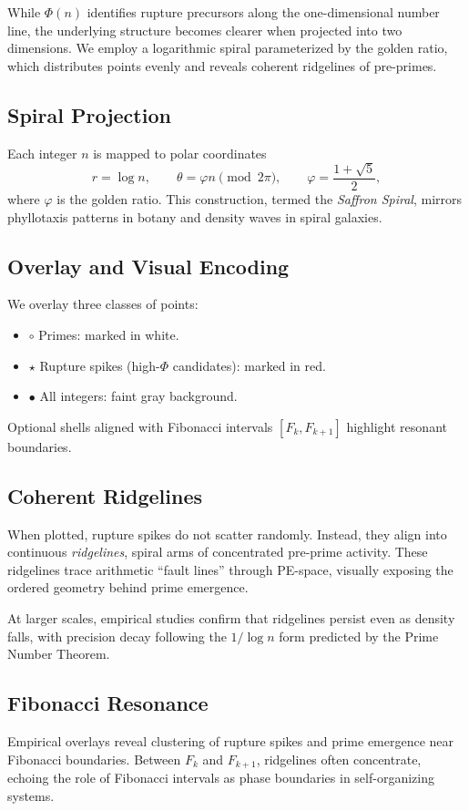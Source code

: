 \documentclass[11pt]{article}
\theoremstyle{plain}
\theoremstyle{definition}
\begin{document}
While $\Phi(n)$ identifies rupture precursors along the one-dimensional number line, the underlying structure becomes clearer when projected into two dimensions. We employ a logarithmic spiral parameterized by the golden ratio, which distributes points evenly and reveals coherent ridgelines of pre-primes.

\subsection{Spiral Projection}
Each integer $n$ is mapped to polar coordinates
\[
r = \log n, 
\qquad \theta = \varphi n \pmod{2\pi}, 
\qquad \varphi = \frac{1+\sqrt{5}}{2},
\]
where $\varphi$ is the golden ratio. This construction, termed the \emph{Saffron Spiral}, mirrors phyllotaxis patterns in botany and density waves in spiral galaxies.

\subsection{Overlay and Visual Encoding}
We overlay three classes of points:
\begin{itemize}
  \item $\circ$ Primes: marked in white.
  \item $\star$ Rupture spikes (high-$\Phi$ candidates): marked in red.
  \item $\bullet$ All integers: faint gray background.
\end{itemize}
Optional shells aligned with Fibonacci intervals $[F_k,F_{k+1}]$ highlight resonant boundaries.

\subsection{Coherent Ridgelines}
When plotted, rupture spikes do not scatter randomly. Instead, they align into continuous \emph{ridgelines}, spiral arms of concentrated pre-prime activity. These ridgelines trace arithmetic “fault lines” through PE-space, visually exposing the ordered geometry behind prime emergence.  

At larger scales, empirical studies confirm that ridgelines persist even as density falls, with precision decay following the $1/\log n$ form predicted by the Prime Number Theorem.

\subsection{Fibonacci Resonance}
Empirical overlays reveal clustering of rupture spikes and prime emergence near Fibonacci boundaries. Between $F_k$ and $F_{k+1}$, ridgelines often concentrate, echoing the role of Fibonacci intervals as phase boundaries in self-organizing systems.  
\end{document}
